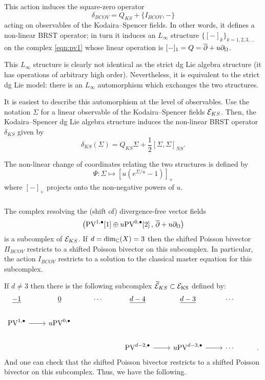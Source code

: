\documentclass[11pt]{amsart}
\begin{document}
This action induces the square-zero operator 
\[
\delta_{BCOV} = Q_{KS} + \{I_{BCOV}, -\} 
\]
acting on observables of the Kodaira--Spencer fields. 
In other words, it defines a non-linear BRST operator; in turn it
induces an $L_\infty$ structure $\{[-]_k\}_{k =1,2,3,\ldots}$ on the complex \eqref{eqn:pv1} whose linear operation is $[-]_1 = Q = \overline{\partial} + u\partial_{\Omega}$. 

This $L_\infty$ structure is clearly not identical as the strict dg Lie algebra structure (it has operations of arbitrary high order). 
Nevertheless, it is equivalent to the strict dg Lie model: there is an $L_\infty$ automorphism which exchanges the two structures.

It is easiest to describe this automorphism at the level of observables.
Use the notation $\Sigma$ for a linear observable of the Kodaira--Spencer fields $\mathcal E_{KS}$. 
Then, the Kodaira--Spencer dg Lie algebra structure induces the non-linear BRST operator $\delta_{KS}$ given by
\[
\delta_{KS} (\Sigma) = Q_{KS} \Sigma + \frac12 [\Sigma,\Sigma]_{NS} .
\]

The non-linear change of coordinates relating the two structures is defined by
\[
\Psi \colon \Sigma \mapsto \left[u (e^{\Sigma/u} -1)\right]_+
\]
where $[-]_+$ projects onto the non-negative powers of $u$.  

\subsubsection{}

The complex resolving the (shift of) divergence-free vector fields 
\[
\left({\rm PV}^{1,\bullet}[1] \oplus u {\rm PV}^{0,\bullet}[2] \, , \, \overline{\partial} + u \partial_{\Omega}\right) 
\]
is a subcomplex of $\mathcal E_{KS}$.
If $d = \dim_\mathbb C(X)=3$ then the shifted Poisson bivector $\Pi_{BCOV}$ restricts to a shifted Poisson bivector on this subcomplex. 
In particular, the action $I_{BCOV}$ restricts to a solution to the classical master equation for this subcomplex. 

If $d \ne 3$ then there is the following subcomplex $\widetilde{\mathcal E}_{KS}\subset \mathcal E_{\rm KS}$ defined by:
\[
\begin{tikzcd}
\ul{-1} & \ul{0} & \cdots & \ul{d-4} & \ul{d-3} & \cdots    \\
\PV^{1,\bu} \ar[r] & u\PV^{0,\bu} & & & & &  \\
& & & \PV^{d-2, \bu} \ar[r] & u \PV^{d-3, \bu} \ar[r] & \cdots &   .
\end{tikzcd}
\]
And one can check that the shifted Poisson bivector restricts to a shifted Poisson bivector on this subcomplex. 
Thus, we have the following.
\end{document}
